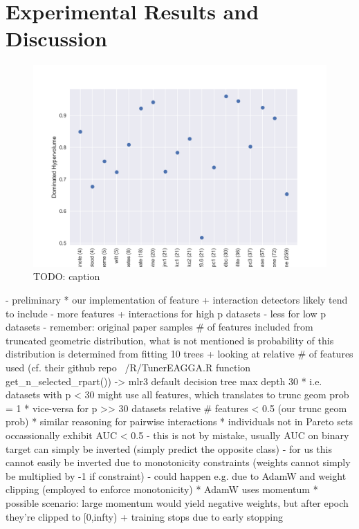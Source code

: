 \documentclass[twoside,11pt]{article}
\begin{document}
\section{Experimental Results and Discussion}
\begin{figure}
  \centering
  \includegraphics[width=0.9\linewidth]{../code/export/plot_test_dhvs.png}
  \caption{TODO: caption}
  \label{fig-test-dhvs}
\end{figure}
- preliminary
  * our implementation of feature + interaction detectors likely tend to include
    - more features + interactions for high p datasets
    - less for low p datasets
    - remember: original paper samples \# of features included from truncated geometric distribution, what is not mentioned is probability of this distribution
      is determined from fitting 10 trees + looking at relative \# of features used (cf. their github repo ~/R/TunerEAGGA.R function get\_n\_selected\_rpart())
    -> mlr3 default decision tree max depth 30
      * i.e. datasets with p < 30 might use all features, which translates to trunc geom prob = 1
      * vice-versa for p >> 30 datasets relative \# features < 0.5 (our trunc geom prob)
      * similar reasoning for pairwise interactions
  * individuals not in Pareto sets occassionally exhibit AUC < 0.5
    - this is not by mistake, usually AUC on binary target can simply be inverted (simply predict the opposite class)
    - for us this cannot easily be inverted due to monotonicity constraints (weights cannot simply be multiplied by -1 if constraint)
    - could happen e.g. due to AdamW and weight clipping (employed to enforce monotonicity)
      * AdamW uses momentum
      * possible scenario: large momentum would yield negative weights, but after epoch they're clipped to [0,infty) + training stops due to early stopping
\end{document}
